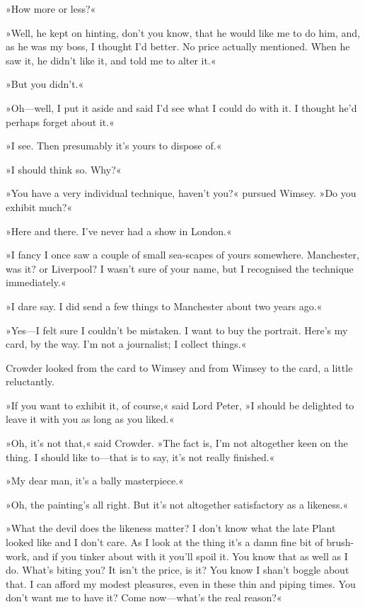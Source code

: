 »How more or less?«

»Well, he kept on hinting, don't you know, that he would like me to do him, and, as he was my boss, I thought I'd better. No price actually mentioned. When he saw it, he didn't like it, and told me to alter it.«

»But you didn't.«

»Oh—well, I put it aside and said I'd see what I could do with it. I thought he'd perhaps forget about it.«

»I see. Then presumably it's yours to dispose of.«

»I should think so. Why?«

»You have a very individual technique, haven't you?« pursued Wimsey. »Do you exhibit much?«

»Here and there. I've never had a show in London.«

»I fancy I once saw a couple of small sea-scapes of yours somewhere. Manchester, was it? or Liverpool? I wasn't sure of your name, but I recognised the technique immediately.«

»I dare say. I did send a few things to Manchester about two years ago.«

»Yes—I felt sure I couldn't be mistaken. I want to buy the portrait. Here's my card, by the way. I'm not a journalist; I collect things.«

Crowder looked from the card to Wimsey and from Wimsey to the card, a little reluctantly.

»If you want to exhibit it, of course,« said Lord Peter, »I should be delighted to leave it with you as long as you liked.«

»Oh, it's not that,« said Crowder. »The fact is, I'm not altogether keen on the thing. I should like to—that is to say, it's not really finished.«

»My dear man, it's a bally masterpiece.«

»Oh, the painting's all right. But it's not altogether satisfactory as a likeness.«

»What the devil does the likeness matter? I don't know what the late Plant looked like and I don't care. As I look at the thing it's a damn fine bit of brush-work, and if you tinker about with it you'll spoil it. You know that as well as I do. What's biting you? It isn't the price, is it? You know I shan't boggle about that. I can afford my modest pleasures, even in these thin and piping times. You don't want me to have it? Come now—what's the real reason?«

